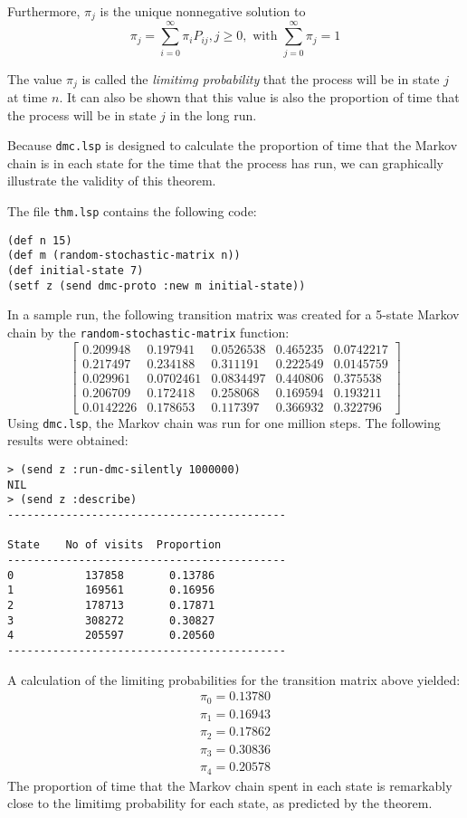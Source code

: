 Furthermore, $\pi_{j}$ is the unique nonnegative solution to
\[ \pi_{j} = \sum_{i=0}^{\infty} \pi_{i}P_{ij},  j \geq 0, 
\mbox{ with } \sum_{j=0}^{\infty} \pi_{j} = 1 \]

The value $\pi_{j}$ is called the {\em limitimg probability} that the
process will be in state $j$ at time $n$.  It can also be shown that
this value is  also the proportion of time that the process will be in
state $j$ in the long run. 

Because {\tt dmc.lsp} is designed to calculate the proportion of time that 
the Markov chain is in each state for the time that the process has
run, we  can graphically illustrate the validity of this theorem.

The file {\tt thm.lsp} contains the following code:
\begin{verbatim}
(def n 15)
(def m (random-stochastic-matrix n))
(def initial-state 7)
(setf z (send dmc-proto :new m initial-state))
\end{verbatim}
In a sample run, the following transition matrix was created for a
5-state Markov chain by the {\tt random-stochastic-matrix} function:
\[ \left[ \begin{array}{ccccc}
	0.209948  & 0.197941  & 0.0526538 & 0.465235 & 0.0742217 \\
	0.217497  & 0.234188  & 0.311191  & 0.222549 & 0.0145759 \\
	0.029961  & 0.0702461 & 0.0834497 & 0.440806 & 0.375538  \\
	0.206709  & 0.172418  & 0.258068  & 0.169594 & 0.193211  \\
	0.0142226 & 0.178653  & 0.117397  & 0.366932 & 0.322796  
	  \end{array} \right] \]
Using {\tt dmc.lsp}, the Markov chain was run for one million steps.
The following results were obtained:
\begin{verbatim}
> (send z :run-dmc-silently 1000000)
NIL
> (send z :describe)
-------------------------------------------

State    No of visits  Proportion
-------------------------------------------
0           137858       0.13786
1           169561       0.16956
2           178713       0.17871
3           308272       0.30827
4           205597       0.20560
-------------------------------------------
\end{verbatim}
A calculation of the limiting probabilities for the transition matrix
above yielded:
\[ \begin{array}{c}
	\pi_{0}=0.13780 \\ 
   	\pi_{1}=0.16943 \\
   	\pi_{2}=0.17862 \\
   	\pi_{3}=0.30836 \\
   	\pi_{4}=0.20578
   \end{array} \]
The proportion of time that the Markov chain spent in each state is
remarkably close to the limitimg probability for each state, as
predicted by the theorem.









